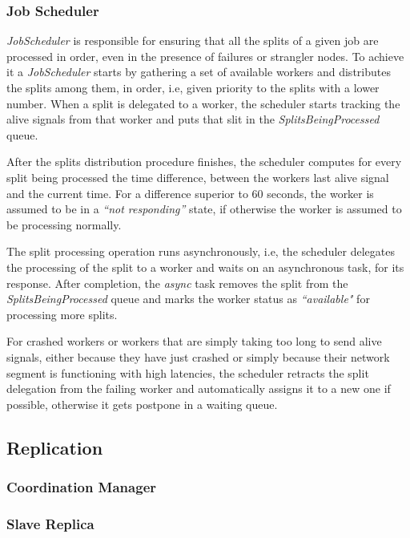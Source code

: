 \documentclass[times, 10pt,twocolumn]{article}
\begin{document}
        	\subsubsection{Job Scheduler}\label{job-scheduler}

            \textit{JobScheduler} is responsible for ensuring that all the splits of a given job are processed in order, even in the presence of failures or strangler nodes. To achieve it a \textit{JobScheduler} starts by gathering a set of available workers and distributes the splits among them, in order, i.e, given priority to the splits with a lower number. When a split is delegated to a worker, the scheduler starts tracking the alive signals from that worker and puts that slit in the \textit{SplitsBeingProcessed} queue.

            After the splits distribution procedure finishes, the scheduler computes for every split being processed the time difference, between the workers last alive signal and the current time. For a difference superior to 60 seconds, the worker is assumed to be in a \textit{``not responding''} state, if otherwise the worker is assumed to be processing normally.

            The split processing operation runs asynchronously, i.e, the scheduler delegates the processing of the split to a worker and waits on an asynchronous task, for its response. After completion, the \textit{async} task removes the split from the \textit{SplitsBeingProcessed} queue and marks the worker status as \textit{``available"} for processing more splits.

            For crashed workers or workers that are simply taking too long to send alive signals, either because they have just crashed or simply because their network segment is functioning with high latencies, the scheduler retracts the split delegation from the failing worker and automatically assigns it to a new one if possible, otherwise it gets postpone in a waiting queue.

        \subsection{Replication}

        	\subsubsection{Coordination Manager}

        	\subsubsection{Slave Replica}
\end{document}
